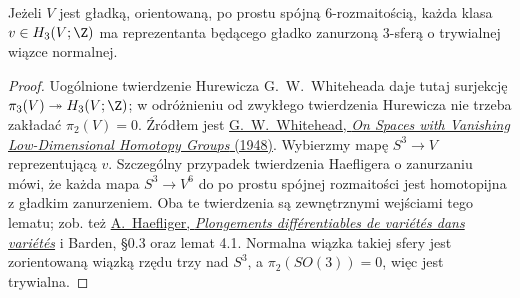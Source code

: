 \begin{lemat}
\label{lem:barden-sfera-24}
Jeżeli $V$ jest gładką, orientowaną,
po prostu spójną $6$-rozmaitością,
każda klasa $v\in H_3(V;\Z)$ ma
reprezentanta będącego gładko
zanurzoną $3$-sferą o trywialnej
wiązce normalnej.
\end{lemat}
\begin{proof}
Uogólnione twierdzenie Hurewicza
G.~W.~Whiteheada daje tutaj
surjekcję $\pi_3(V)\twoheadrightarrow
H_3(V;\Z)$; w odróżnieniu od zwykłego
twierdzenia Hurewicza nie trzeba
zakładać $\pi_2(V)=0$.
Źródłem jest
\href{https://doi.org/10.1073/pnas.34.5.207}
{G.\ W.\ Whitehead, \emph{On Spaces with
Vanishing Low-Dimensional Homotopy
Groups} (1948)}.
Wybierzmy mapę $S^3\to V$ reprezentującą
$v$. Szczególny przypadek twierdzenia
Haefligera o zanurzaniu mówi, że każda
mapa $S^3\to V^6$ do po prostu spójnej
rozmaitości jest homotopijna z gładkim
zanurzeniem. Oba te twierdzenia są
zewnętrznymi wejściami tego lematu;
zob. też
\href{https://www.maths.ed.ac.uk/~v1ranick/papers/haeflig2.pdf}
{A.\ Haefliger, \emph{Plongements
différentiables de variétés dans variétés}}
i Barden, §0.3 oraz lemat 4.1.
Normalna wiązka takiej sfery jest
zorientowaną wiązką rzędu trzy nad
$S^3$, a $\pi_2(SO(3))=0$, więc jest
trywialna.
\end{proof}

